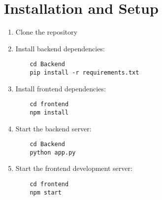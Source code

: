 \documentclass[12pt,a4paper]{article}
\begin{document}
\section{Installation and Setup}
\begin{enumerate}
    \item Clone the repository
    \item Install backend dependencies:
    \begin{lstlisting}
    cd Backend
    pip install -r requirements.txt
    \end{lstlisting}
    \item Install frontend dependencies:
    \begin{lstlisting}
    cd frontend
    npm install
    \end{lstlisting}
    \item Start the backend server:
    \begin{lstlisting}
    cd Backend
    python app.py
    \end{lstlisting}
    \item Start the frontend development server:
    \begin{lstlisting}
    cd frontend
    npm start
    \end{lstlisting}
\end{enumerate}
\end{document}
